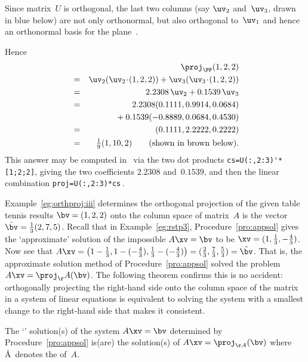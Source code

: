 \begin{example}
\begin{enumerate}
\begin{solution}
Since matrix~\(U\) is orthogonal, the last two columns (say \(\uv_2\) and~\(\uv_3\), drawn in blue below) are not only orthonormal, but also orthogonal to~\(\uv_1\) and hence an orthonormal basis for the plane~\PP.
\begin{center}\end{center}
Hence
\begin{eqnarray*}
&&\proj_\PP(1,2,2)
\\&=&\uv_2(\uv_2\cdot(1,2,2))+\uv_3(\uv_3\cdot(1,2,2))
\\&=&2.2308\,\uv_2+0.1539\,\uv_3
\\&=&2.2308(0.1111,0.9914,0.0684)
\\&&{}+0.1539(-0.8889,0.0684,0.4530)
\\&=&(0.1111,2.2222,0.2222)
\\&=&\tfrac19(1,10,2)
\qquad(\text{shown in brown below}).
\end{eqnarray*}
This answer may be computed in \script\ via the two dot products \verb|cs=U(:,2:3)'*[1;2;2]|, giving the two coefficients \(2.2308\) and~\(0.1539\), and then the linear combination \verb|proj=U(:,2:3)*cs|\,.
\begin{center}\end{center}
\end{solution}
\end{enumerate}
\end{example}


Example~\ref{eg:orthproj:iii} determines the orthogonal projection of the given table tennis results \(\bv=(1,2,2)\) onto the column space of matrix~\(A\) is the vector \(\tilde\bv=\tfrac13(2,7,5)\).
Recall that in Example~\ref{eg:rstp3}, Procedure~\ref{pro:appsol} gives the `approximate' solution of the impossible \(A\xv=\bv\) to be \(\xv=(1,\frac13,-\frac43)\).
Now see that \(A\xv
=\big(1-\frac13,1-(-\frac43),\frac13-(-\frac43)\big)
=(\frac23,\frac73,\frac53)
=\tilde\bv\).
That is, the approximate solution method of Procedure~\ref{pro:appsol} solved the problem \(A\xv=\proj_\AA(\bv)\).
The following theorem confirms this is no accident: orthogonally projecting the right-hand side onto the column space of the matrix in a system of linear equations is equivalent to solving the system with a smallest change to the right-hand side that makes it consistent.


\begin{theorem}[] \label{thm:lsqproj}
The `' solution(s) of the system \(A\xv=\bv\) determined by Procedure~\ref{pro:appsol} is(are) the solution(s) of \(A\xv=\proj_{\AA}(\bv)\) where \AA~denotes the  of~\(A\).
\end{theorem}

